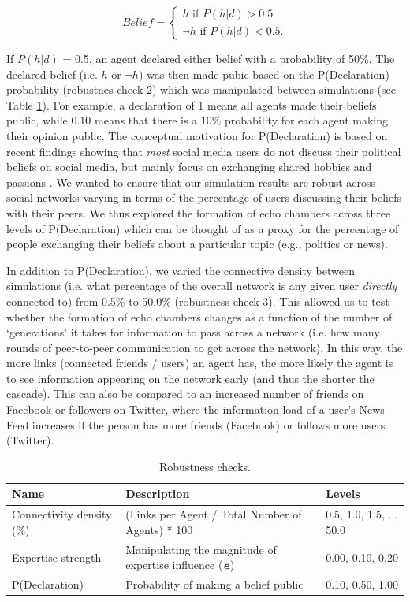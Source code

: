 \documentclass[fleqn,10pt]{wlscirep}
\begin{document}
\[
Belief = \begin{cases}
h \text{ if } P(h|d) > 0.5 \\
\neg h \text{ if } P(h|d) < 0.5. 
\end{cases}
\]

If \(P(h|d)\) = 0.5, an agent declared either belief with a probability of 50\%. The declared belief (i.e. \(h\) or \(\neg h\))  was then made pubic based on the P(Declaration) probability (robustnes check 2) which was manipulated between simulations (see Table \ref{tab:t1}). For example, a declaration of 1 means all agents made their beliefs public, while 0.10 means that there is a 10\% probability for each agent making their opinion public. The conceptual motivation for P(Declaration) is based on recent findings showing that \emph{most} social media users do not discuss their political beliefs on social media, but mainly focus on exchanging shared hobbies and passions \cite{newman2019reuters}. We wanted to ensure that our simulation results are robust across social networks varying in terms of the percentage of users discussing their beliefs with their peers. We thus explored the formation of echo chambers across three levels of P(Declaration) which can be thought of as a proxy for the percentage of people exchanging their beliefs about a particular topic (e.g., politics or news). 

In addition to P(Declaration), we varied the connective density between simulations (i.e. what percentage of the overall network is any given user \textit{directly} connected to) from 0.5\% to 50.0\% (robustness check 3). This allowed us to test whether the formation of echo chambers changes as a function of the number of `generations' it takes for information to pass across a network (i.e. how many rounds of peer-to-peer communication to get across the network). In this way, the more links (connected friends / users) an agent has, the more likely the agent is to see information appearing on the network early (and thus the shorter the cascade). This can also be compared to an increased number of friends on Facebook or followers on Twitter, where the information load of a user's News Feed increases if the person has more friends (Facebook) or follows more users (Twitter). 


\begin{table}[ht]
\label{tab:robustness_checks}
\centering
\begin{tabular}{|l|l|l|}
\hline
Name & Description & Levels\\
\hline
Connectivity density (\%) & (Links per Agent / Total Number of Agents) * 100 & 0.5, 1.0, 1.5, ... 50.0\\
Expertise strength & Manipulating the magnitude of expertise influence (\(\textbf{\textit{e}}\)) & 0.00, 0.10, 0.20\\
P(Declaration) & Probability of making a belief public & 0.10, 0.50, 1.00\\
\hline
\end{tabular}
\caption{\label{tab:t1}Robustness checks.}
\end{table}
\end{document}
